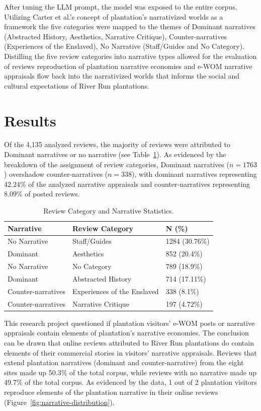 \documentclass[final]{anthology-ch} %
\begin{document}
After tuning the LLM prompt, the model was exposed to the entire corpus. Utilizing Carter et al.'s concept of plantation's narrativized worlds as a framework the five categories were mapped to the themes of Dominant narratives (Abstracted History, Aesthetics, Narrative Critique), Counter-narratives (Experiences of the Enslaved), No Narrative (Staff/Guides and No Category). Distilling the five review categories into narrative types allowed for the evaluation of reviews reproduction of plantation narrative economies and e-WOM narrative appraisals flow back into the narrativized worlds that informs the social and cultural expectations of River Run plantations.

\section{Results}

Of the 4,135 analyzed reviews, the majority of reviews were attributed to Dominant narratives or no narrative (see Table~\ref{tab:narrative-stats}). As evidenced by the breakdown of the assignment of review categories, Dominant narratives ($n=1763$) overshadow counter-narratives ($n=338$), with dominant narratives representing 42.24\% of the analyzed narrative appraisals and counter-narratives representing 8.09\% of posted reviews.

\begin{table}[h]
  \centering
  \begin{tabular}{lll}
    \toprule
    Narrative & Review Category & N (\%) \\
    \midrule
    No Narrative & Staff/Guides & 1284 (30.76\%) \\
    Dominant & Aesthetics & 852 (20.4\%) \\
    No Narrative & No Category & 789 (18.9\%) \\
    Dominant & Abstracted History & 714 (17.11\%) \\
    Counter-narratives & Experiences of the Enslaved & 338 (8.1\%) \\
    Counter-narratives & Narrative Critique & 197 (4.72\%) \\
    \bottomrule
  \end{tabular}
  \caption{Review Category and Narrative Statistics.}
  \label{tab:narrative-stats}
\end{table}

This research project questioned if plantation visitors' e-WOM posts or narrative appraisals contain elements of plantation's narrative economies. The conclusion can be drawn that online reviews attributed to River Run plantations do contain elements of their commercial stories in visitors' narrative appraisals. Reviews that extend plantation narratives (dominant and counter-narrative) from the eight sites made up 50.3\% of the total corpus, while reviews with no narrative made up 49.7\% of the total corpus. As evidenced by the data, 1 out of 2 plantation visitors reproduce elements of the plantation narrative in their online reviews (Figure~\ref{fig:narrative-distribution}).
\end{document}
